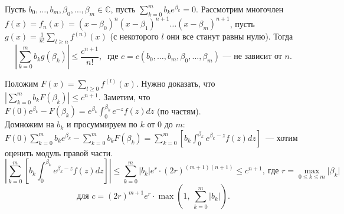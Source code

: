 \begin{lemma} \label{l14_lm7}
	Пусть $b_0,\dots,b_m,\beta_0,\dots,\beta_m \in \mathbb{C}$, пусть $\displaystyle \sum\limits_{k=0}^m b_ke^{\beta_k} = 0$.
	Рассмотрим многочлен $f(x)=f_n(x) = (x-\beta_0)^n(x-\beta_1)^{n+1}\dots(x-\beta_m)^{n+1}$, пусть $\displaystyle g(x) = \frac{1}{n!}\sum\limits_{l \geq n} f^{(n)}(x)$ (с некоторого $l$ они все станут равны нулю). Тогда
	$$\left| \sum\limits_{k=0}^m b_kg(\beta_k) \right| \leq \frac{c^{n+1}}{n!}, \ \text{ где } c=c(b_0,\dots,b_m,\beta_0,\dots,\beta_m) \text{ — не зависит от } n.$$
\end{lemma}
\begin{pf}
	Положим $\displaystyle F(x) = \sum\limits_{l \geq 0} f^{(l)}(x)$. Нужно доказать, что $\displaystyle \left| \sum\limits_{k=0}^m b_kF(\beta_k) \right| \leq c^{n+1}$.
	Заметим, что $\displaystyle F(0)e^{\beta_k} - F(\beta_k) = e^{\beta_k} \int_0^{\beta_k}e^{-z}f(z)dz$ (по частям).\\
	Домножим на $b_k$ и просуммируем по $k$ от $0$ до $m$:\\
	$\displaystyle F(0)\sum_{k=0}^m b_ke^{\beta_k} - \sum\limits_{k=0}^m b_kF(\beta_k) = \sum\limits_{k=0}^m \left[ b_k\int_0^{\beta_k} e^{\beta_k-z}f(z)dz \right]$ — хотим оценить модуль правой части.
	$$\left| \sum\limits_{k=0}^m \left[ b_k\int_0^{\beta_k} e^{\beta_k-z}f(z)dz \right] \right| \leq \sum\limits_{k=0}^m |b_k|e^r \cdot (2r)^{(m+1)(n+1)} \leq c^{n+1}, \ \text{где } r=\max\limits_{0\leq k \leq m} \lvert \beta_k \rvert$$
	$$\text{для } c=(2r)^{m+1}e^r\cdot\max\left( 1, \, \sum\limits_{k=0}^m \lvert b_k \rvert \right).$$
\end{pf}

